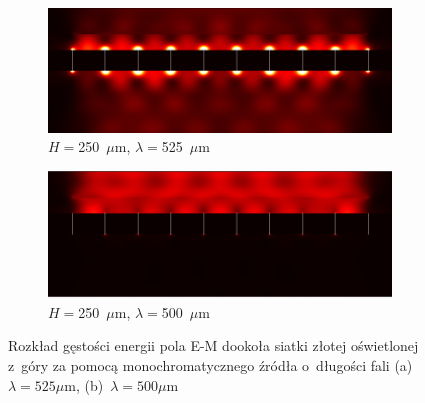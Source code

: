 \begin{figure}[bth]
	\begin{subfigure}{0.45\textwidth}
		\includegraphics[width=\textwidth]{images/thz/con_src_l525.png}
		\caption{$H=$250~$\mu$m, $\lambda=$525~$\mu$m}
		\label{fig:consrcl525}
	\end{subfigure}
	\begin{subfigure}{0.45\textwidth}
		\includegraphics[width=\textwidth]{images/thz/con_src_l500.png}
		\caption{$H=$250~$\mu$m, $\lambda=$500~$\mu$m}
		\label{fig:consrcl500}
	\end{subfigure}
	\caption{Rozkład gęstości energii pola E-M dookoła siatki złotej oświetlonej z~góry za pomocą monochromatycznego źródła o~długości fali (a)~$\lambda=525\mu$m, (b)~$\lambda=500\mu$m} 
\end{figure}


